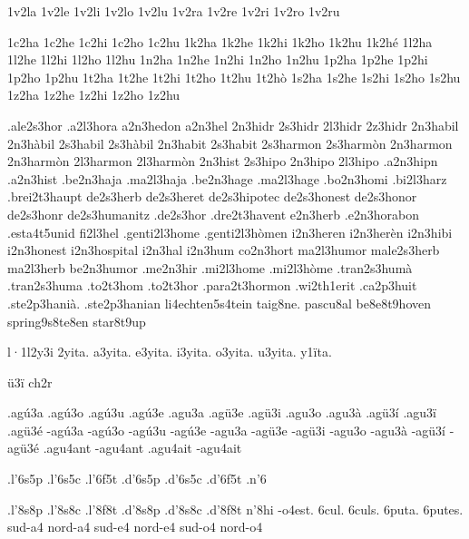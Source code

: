 {%
1v2la 1v2le 1v2li 1v2lo 1v2lu
1v2ra 1v2re 1v2ri 1v2ro 1v2ru


1c2ha 1c2he 1c2hi 1c2ho 1c2hu
1k2ha 1k2he 1k2hi 1k2ho 1k2hu
1k2hé
1l2ha 1l2he 1l2hi 1l2ho 1l2hu
1n2ha 1n2he 1n2hi 1n2ho 1n2hu
1p2ha 1p2he 1p2hi 1p2ho 1p2hu
1t2ha 1t2he 1t2hi 1t2ho 1t2hu
1t2hò
1s2ha 1s2he 1s2hi 1s2ho 1s2hu
1z2ha 1z2he 1z2hi 1z2ho 1z2hu

.ale2s3hor
.a2l3hora
a2n3hedon
a2n3hel
2n3hidr
2s3hidr
2l3hidr
2z3hidr
2n3habil
2n3hàbil
2s3habil
2s3hàbil
2n3habit
2s3habit
2s3harmon
2s3harmòn
2n3harmon
2n3harmòn
2l3harmon
2l3harmòn
2n3hist
2s3hipo
2n3hipo
2l3hipo
.a2n3hipn
.a2n3hist
.be2n3haja
.ma2l3haja
.be2n3hage
.ma2l3hage
.bo2n3homi
.bi2l3harz
.brei2t3haupt
de2s3herb
de2s3heret
de2s3hipotec
de2s3honest
de2s3honor
de2s3honr
de2s3humanitz
.de2s3hor
.dre2t3havent
e2n3herb
.e2n3horabon
.esta4t5unid
fi2l3hel
.genti2l3home
.genti2l3hòmen
i2n3heren
i2n3herèn
i2n3hibi
i2n3honest
i2n3hospital
i2n3hal
i2n3hum
co2n3hort
ma2l3humor
male2s3herb
ma2l3herb
be2n3humor
.me2n3hir
.mi2l3home
.mi2l3hòme
.tran2s3humà
.tran2s3huma
.to2t3hom
.to2t3hor
.para2t3hormon
.wi2th1erit %
.ca2p3huit
.ste2p3hanià. %
.ste2p3hanian %
li4echten5s4tein
taig8ne.
pascu8al
be8e8t9hoven
spring9s8te8en
star8t9up

l·1l2y3i
2yita.
a3yita.
e3yita.
i3yita.
o3yita.
u3yita.
y1ïta.

ü3ï
ch2r

.agú3a
.agú3o
.agú3u
.agú3e
.agu3a
.agü3e
.agü3i
.agu3o %
.agu3à
.agü3í
.agu3ï
.agü3é
-agú3a
-agú3o
-agú3u
-agú3e
-agu3a
-agü3e
-agü3i
-agu3o %
-agu3à
-agü3í
-agü3é
.agu4ant
-agu4ant
.agu4ait
-agu4ait

.l'6s5p
.l'6s5c
.l'6f5t
.d'6s5p
.d'6s5c
.d'6f5t
.n'6

.l'8s8p
.l'8s8c
.l'8f8t
.d'8s8p
.d'8s8c
.d'8f8t
n'8hi
-o4est.
6cul.
6culs.
6puta.
6putes.
sud-a4
nord-a4
sud-e4
nord-e4
sud-o4
nord-o4
}

